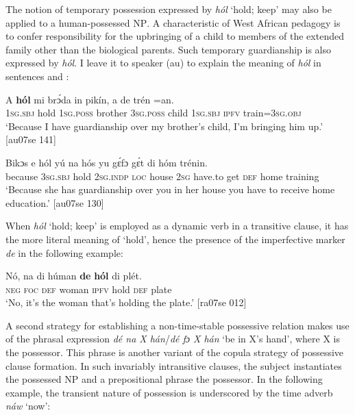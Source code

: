 The notion of temporary possession expressed by \textit{hól} ‘hold; keep’ may also be applied to a human-possessed \textsc{NP}. A characteristic of West African pedagogy is to confer responsibility for the upbringing of a child to members of the extended family other than the biological parents. Such temporary guardianship is also expressed by \textit{hól}. I leave it to speaker (au) to explain the meaning of \textit{hól} in sentences  and :


\ea%
    \label{ex:key:825}
    \gll A    \textbf{hól}    mi    brɔ́da  in    pikín,  a    de  {trén  =an}.\\
\textsc{1sg.sbj}  hold    \textsc{1sg.poss}  brother  \textsc{3sg.poss}  child  \textsc{1sg.sbj}  \textsc{ipfv}  train=\textsc{3sg.obj}\\

\glt ‘Because I have guardianship over my brother’s child, I’m bringing him up.’ [au07se 141]
\z


\ea%
    \label{ex:key:826}
    \gll Bikɔs  e    hól    yú    na  hós    yu  gɛ́fɔ    gɛ́t
di  hóm    trénin.\\
because  \textsc{3sg.sbj}  hold    \textsc{2sg.indp}  \textsc{loc}  house  \textsc{2sg}  have.to  get
\textsc{def}  home  training\\

\glt ‘Because she has guardianship over you in her house you have to receive 
home education.’ [au07se 130]
\z

When \textit{hól} ‘hold; keep’ is employed as a dynamic verb in a transitive clause, it has the more literal meaning of ‘hold’, hence the presence of the imperfective marker \textit{de} in the following example: 


\ea%
    \label{ex:key:827}
    \gll Nó,  na  di  húman  \textbf{de}  \textbf{hól}    di  plét.\\
\textsc{neg}  \textsc{foc}  \textsc{def}  woman  \textsc{ipfv}  hold    \textsc{def}  plate\\

\glt ‘No, it’s the woman that’s holding the plate.’ [ra07se 012]
\z

A second strategy for establishing a non-time-stable possessive relation makes use of the phrasal expression \textit{dé na X hán}/\textit{dé fɔ X hán} ‘be in X’s hand’, where X is the possessor. This phrase is another variant of the copula strategy of possessive clause formation. In such invariably intransitive clauses, the subject instantiates the possessed \textsc{NP} and a prepositional phrase the possessor. In the following example, the transient nature of possession is underscored by the time adverb \textit{náw} ‘now’: 


